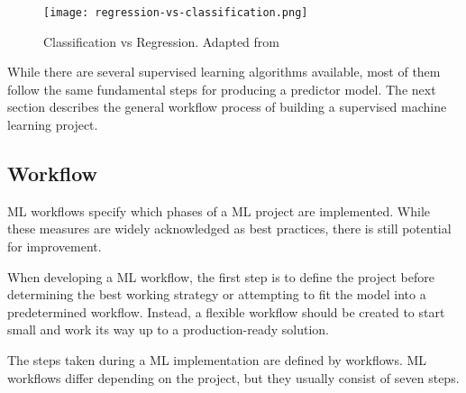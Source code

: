 \begin{figure}[htbp]
    \centering
    \texttt{[image: regression-vs-classification.png]}
    \caption{Classification vs Regression. Adapted from~\cite{Matanga2017AnalysisInterfaces}}
    \label{fig:regression_vs_classification}
\end{figure}


While there are several supervised learning algorithms available, most of them follow the same fundamental steps for producing a predictor model. The next section describes the general workflow process of building a supervised machine learning project.

\subsection{Workflow}

\gls{ML} workflows specify which phases of a \gls{ML} project are implemented. While these measures are widely acknowledged as best practices, there is still potential for improvement. 

When developing a \gls{ML} workflow, the first step is to define the project before determining the best working strategy or attempting to fit the model into a predetermined workflow. Instead, a flexible workflow should be created to start small and work its way up to a production-ready solution.

The steps taken during a \gls{ML} implementation are defined by workflows. \gls{ML} workflows differ depending on the project, but they usually consist of seven steps.

